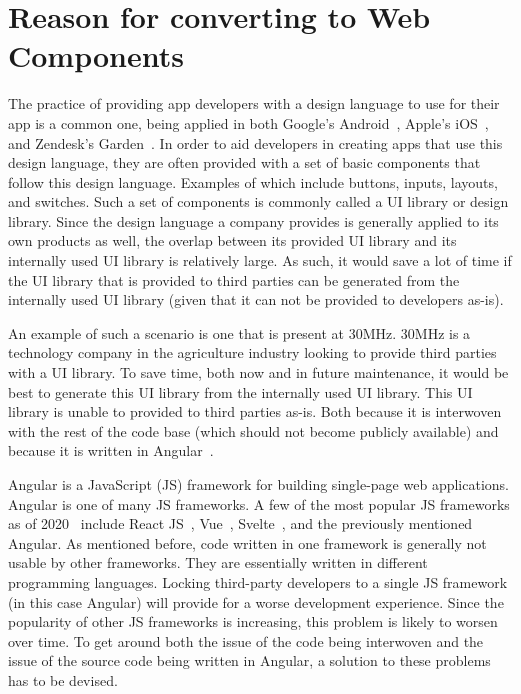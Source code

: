 \section{Reason for converting to Web Components}
The practice of providing app developers with a design language to use for their app is a common one, being applied in both Google's Android~, Apple's iOS~, and Zendesk's Garden~. In order to aid developers in creating apps that use this design language, they are often provided with a set of basic components that follow this design language. Examples of which include buttons, inputs, layouts, and switches. Such a set of components is commonly called a UI library or design library. Since the design language a company provides is generally applied to its own products as well, the overlap between its provided UI library and its internally used UI library is relatively large. As such, it would save a lot of time if the UI library that is provided to third parties can be generated from the internally used UI library (given that it can not be provided to developers as-is).

An example of such a scenario is one that is present at 30MHz. 30MHz is a technology company in the agriculture industry looking to provide third parties with a UI library. To save time, both now and in future maintenance, it would be best to generate this UI library from the internally used UI library. This UI library is unable to provided to third parties as-is. Both because it is interwoven with the rest of the code base (which should not become publicly available) and because it is written in Angular~.

Angular is a JavaScript (JS) framework for building single-page web applications. Angular is one of many JS frameworks. A few of the most popular JS frameworks as of 2020~ include React JS~, Vue~, Svelte~, and the previously mentioned Angular. As mentioned before, code written in one framework is generally not usable by other frameworks. They are essentially written in different programming languages. Locking third-party developers to a single JS framework (in this case Angular) will provide for a worse development experience. Since the popularity of other JS frameworks is increasing, this problem is likely to worsen over time. To get around both the issue of the code being interwoven and the issue of the source code being written in Angular, a solution to these problems has to be devised.

